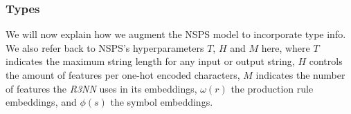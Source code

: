\documentclass{article}
\begin{document}




\subsubsection{Types} \label{sec:typednsps}

We will now explain how we augment the NSPS model to incorporate type info.
We also refer back to NSPS's hyperparameters $T$, $H$ and $M$ here,
where $T$ indicates the maximum string length for any input or output string,
$H$ controls the amount of features per one-hot encoded characters,
$M$ indicates the number of features the \emph{R3NN} uses in its embeddings,
$\omega(r)$ the production rule embeddings,
and $\phi(s)$ the symbol embeddings.
\end{document}
